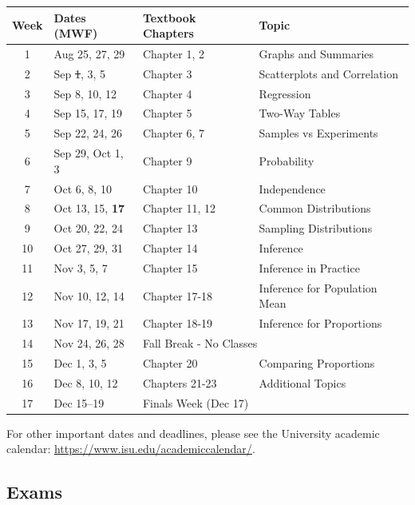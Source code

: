 \documentclass[11pt]{article}\usepackage[]{graphicx}\usepackage[]{xcolor}
\begin{document}
\begin{longtable}{|c|l|l|l|}
\hline
\textbf{Week} & \textbf{Dates (MWF)} & \textbf{Textbook Chapters} & \textbf{Topic} \\
\hline
\endhead

1 & Aug 25, 27, 29 & Chapter 1, 2 & Graphs and Summaries \\ \hline
2 & Sep {\color{red} \sout{1}}, 3, 5 & Chapter 3 & Scatterplots and Correlation \\ \hline
3 & Sep 8, 10, 12 & Chapter 4 & Regression \\ \hline
4 & Sep 15, 17, 19 & Chapter 5 & Two-Way Tables \\ \hline
5 & Sep 22, 24, 26 & Chapter 6, 7 & Samples vs Experiments \\ \hline
6 & Sep 29, Oct 1, 3 & Chapter 9 & Probability \\ \hline
7 & Oct 6, 8, 10 & Chapter 10 & Independence \\ \hline
8 & Oct 13, 15, {\color{blue} \textbf{17}} & Chapter 11, 12 & Common Distributions \\ \hline
9 & Oct 20, 22, 24 & Chapter 13 & Sampling Distributions \\ \hline
10 & Oct 27, 29, 31 & Chapter 14 & Inference \\ \hline
11 & Nov 3, 5, 7 & Chapter 15 & Inference in Practice\\ \hline
12 & Nov 10, 12, 14 & Chapter 17-18 & Inference for Population Mean \\ \hline
13 & Nov 17, 19, 21 & Chapter 18-19 & Inference for Proportions\\ \hline
14 & Nov 24, 26, 28 & \multicolumn{2}{l|}{Fall Break - No Classes} \\ \hline
15 & Dec 1, 3, 5 & Chapter 20 & Comparing Proportions \\ \hline
16 & Dec 8, 10, 12 & Chapters 21-23 & Additional Topics \\ \hline
17 & Dec 15--19 & \multicolumn{2}{l|}{Finals Week (Dec 17)} \\ \hline

\end{longtable}

For other important dates and deadlines, please see the University academic calendar: \url{https://www.isu.edu/academiccalendar/}.

\subsection{Exams}
\end{document}
